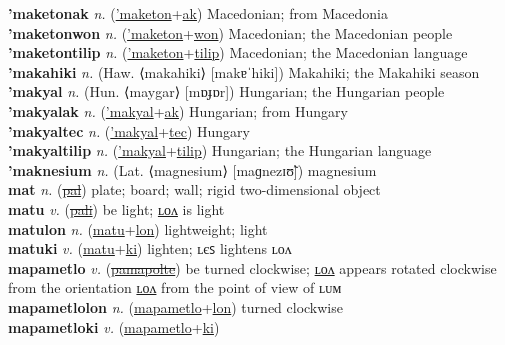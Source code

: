 \textbf{'maketonak} \textit{n.} (\hyperref['maketon]{'maketon}+\hyperref[ak]{ak})
Macedonian; from Macedonia \label{'maketonak} \\
\textbf{'maketonwon} \textit{n.} (\hyperref['maketon]{'maketon}+\hyperref[won]{won})
Macedonian; the Macedonian people \label{'maketonwon} \\
\textbf{'maketontilip} \textit{n.} (\hyperref['maketon]{'maketon}+\hyperref[tilip]{tilip})
Macedonian; the Macedonian language \label{'maketontilip} \\
\textbf{'makahiki} \textit{n.} (Haw. ⟨makahiki⟩ [makɐˈhiki])
Makahiki; the Makahiki season \label{'makahiki} \\
\textbf{'makyal} \textit{n.} (Hun. ⟨maygar⟩ [mɒɟɒr])
Hungarian; the Hungarian people \label{'makyal} \\
\textbf{'makyalak} \textit{n.} (\hyperref['makyal]{'makyal}+\hyperref[ak]{ak})
Hungarian; from Hungary \label{'makyalak} \\
\textbf{'makyaltec} \textit{n.} (\hyperref['makyal]{'makyal}+\hyperref[tec]{tec})
Hungary \label{'makyaltec} \\
\textbf{'makyaltilip} \textit{n.} (\hyperref['makyal]{'makyal}+\hyperref[tilip]{tilip})
Hungarian; the Hungarian language \label{'makyaltilip} \\
\textbf{'maknesium} \textit{n.} (Lat. ⟨magnesium⟩ [maɡnezɪʊ̃])
magnesium \label{'maknesium} \\
\textbf{mat} \textit{n.} (\hyperref[pal]{\sout{pal}})
plate; board; wall; rigid two-dimensional object \label{mat} \\
\textbf{matu} \textit{v.} (\hyperref[pali]{\sout{pali}})
be light; \hyperref[matulon]{ʟᴏᴧ} is light \label{matu} \\
\textbf{matulon} \textit{n.} (\hyperref[matu]{matu}+\hyperref[lon]{lon})
lightweight; light \label{matulon} \\
\textbf{matuki} \textit{v.} (\hyperref[matu]{matu}+\hyperref[ki]{ki})
lighten; ʟєꜱ lightens ʟᴏᴧ \label{matuki} \\
\textbf{mapametlo} \textit{v.} (\hyperref[pamapolte]{\sout{pamapolte}})
be turned clockwise; \hyperref[mapametlolon]{ʟᴏᴧ} appears rotated clockwise from the orientation \hyperref[mapametlolon]{ʟᴏᴧ} from the point of view of ʟᴜᴍ \label{mapametlo} \\
\textbf{mapametlolon} \textit{n.} (\hyperref[mapametlo]{mapametlo}+\hyperref[lon]{lon})
turned clockwise \label{mapametlolon} \\
\textbf{mapametloki} \textit{v.} (\hyperref[mapametlo]{mapametlo}+\hyperref[ki]{ki})
